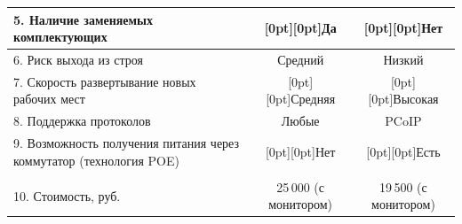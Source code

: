 \begin{table}
\begin{center}
\begin{tabular}{|p{55mm}|c|c|}
\hline

5. Наличие заменяемых комплектующих&\multicolumn{1}{c|}{\raisebox{-6pt}[0pt][0pt]{Да}}&

\multicolumn{1}{c|}{\raisebox{-6pt}[0pt][0pt]{Нет}}\\

\hline

6. Риск выхода из строя&Средний&Низкий\\

\hline

7. Скорость развертывание новых рабочих мест&

\multicolumn{1}{c|}{\raisebox{-6pt}[0pt][0pt]{Средняя}}&

\multicolumn{1}{c|}{\raisebox{-6pt}[0pt][0pt]{Высокая}} \\

\hline

8. Поддержка протоколов&Любые&PCoIP\\

\hline

9. Возможность получения питания через коммутатор (технология POE)&

\multicolumn{1}{c|}{\raisebox{-6pt}[0pt][0pt]{Нет}}&

\multicolumn{1}{c|}{\raisebox{-6pt}[0pt][0pt]{Есть}}\\

\hline

&&\\[-9pt]

10. Стоимость, руб.&25\,000 (с монитором)&19\,500 (с монитором)\\

\hline

\end{tabular}

\end{center}


\end{table}




